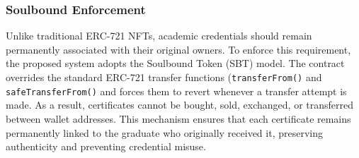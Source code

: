 \subsubsection{Soulbound Enforcement}

Unlike traditional ERC-721 NFTs, academic credentials should remain permanently associated with their original owners. To enforce this requirement, the proposed system adopts the Soulbound Token (SBT) model. The contract overrides the standard ERC-721 transfer functions (\texttt{transferFrom()} and \texttt{safeTransferFrom()} and forces them to revert whenever a transfer attempt is made. As a result, certificates cannot be bought, sold, exchanged, or transferred between wallet addresses. This mechanism ensures that each certificate remains permanently linked to the graduate who originally received it, preserving authenticity and preventing credential misuse.
